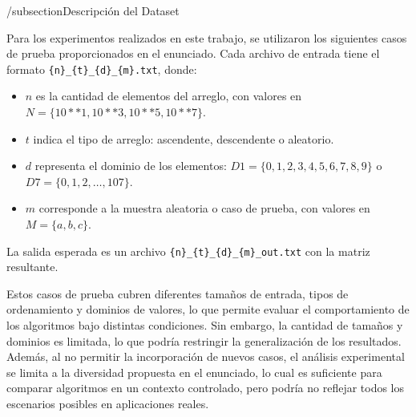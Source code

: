 /subsection{Descripción del Dataset}
 
 Para los experimentos realizados en este trabajo, se utilizaron los siguientes casos de prueba proporcionados en el enunciado. Cada archivo de entrada tiene el formato \texttt{\{n\}\_\{t\}\_\{d\}\_\{m\}.txt}, donde:

\begin{itemize}
    \item $n$ es la cantidad de elementos del arreglo, con valores en $N = \{10**1, 10**3, 10**5, 10**7\}$.
    \item $t$ indica el tipo de arreglo: ascendente, descendente o aleatorio.
    \item $d$ representa el dominio de los elementos: $D1 = \{0,1,2,3,4,5,6,7,8,9\}$ o $D7 = \{0,1,2,\ldots,107\}$.
    \item $m$ corresponde a la muestra aleatoria o caso de prueba, con valores en $M = \{a, b, c\}$.
\end{itemize}

La salida esperada es un archivo \texttt{\{n\}\_\{t\}\_\{d\}\_\{m\}\_out.txt} con la matriz resultante.

Estos casos de prueba cubren diferentes tamaños de entrada, tipos de ordenamiento y dominios de valores, lo que permite evaluar el comportamiento de los algoritmos bajo distintas condiciones. Sin embargo, la cantidad de tamaños y dominios es limitada, lo que podría restringir la generalización de los resultados.
Además, al no permitir la incorporación de nuevos casos, el análisis experimental se limita a la diversidad propuesta en el enunciado, lo cual es suficiente para comparar algoritmos en un contexto controlado, pero podría no reflejar todos los escenarios posibles en aplicaciones reales.